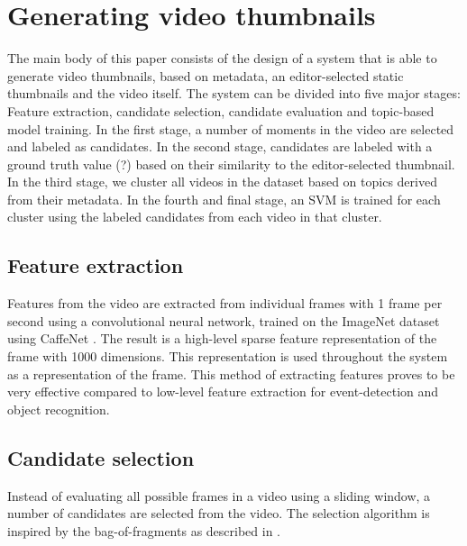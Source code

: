 \documentclass{../resources/acm_proc_article-sp}
\begin{document}
\section{Generating video thumbnails}
\label{system description}
The main body of this paper consists of the design of a system that is able to generate video thumbnails, based on metadata, an editor-selected static thumbnails and the video itself. The system can be divided into five major stages: Feature extraction, candidate selection, candidate evaluation and topic-based model training. In the first stage, a number of moments in the video are selected and labeled as candidates. In the second stage, candidates are labeled with a ground truth value (?) based on their similarity to the editor-selected thumbnail. In the third stage, we cluster all videos in the dataset based on topics derived from their metadata. In the fourth and final stage, an SVM is trained for each cluster using the labeled candidates from each video in that cluster.


\subsection{Feature extraction}
\label{feature extraction}
Features from the video are extracted from individual frames with 1 frame per second using a convolutional neural network, trained on the ImageNet dataset \cite{Krizhevsky:2012wl} using CaffeNet \cite{Jia:2014cm}. The result is a high-level sparse feature representation of the frame with 1000 dimensions. This representation is used throughout the system as a representation of the frame. This method of extracting features proves to be very effective compared to low-level feature extraction for event-detection \cite{Habibian:2013ks, Althoff:2012gf} and object recognition.

\subsection{Candidate selection}
\label{candidate selection}

Instead of evaluating all possible frames in a video using a sliding window, a number of candidates are selected from the video. The selection algorithm is inspired by the bag-of-fragments as described in \cite{Mettes:2015vg}. 
\end{document}
